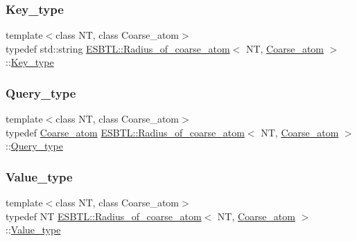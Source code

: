 \subsubsection{\texorpdfstring{Key\+\_\+type}{Key\_type}}
{\footnotesize\ttfamily template$<$class NT, class Coarse\+\_\+atom$>$ \\
typedef std\+::string \hyperlink{classESBTL_1_1Radius__of__coarse__atom}{E\+S\+B\+T\+L\+::\+Radius\+\_\+of\+\_\+coarse\+\_\+atom}$<$ NT, \hyperlink{classESBTL_1_1Coarse__atom}{Coarse\+\_\+atom} $>$\+::\hyperlink{classESBTL_1_1Radius__of__coarse__atom_ade5e52860ae3bd455e1797394fb111c3}{Key\+\_\+type}}

\mbox{\label{classESBTL_1_1Radius__of__coarse__atom_acbb080cc53888dc8ee71551a06921e7d}} 
\subsubsection{\texorpdfstring{Query\+\_\+type}{Query\_type}}
{\footnotesize\ttfamily template$<$class NT, class Coarse\+\_\+atom$>$ \\
typedef \hyperlink{classESBTL_1_1Coarse__atom}{Coarse\+\_\+atom} \hyperlink{classESBTL_1_1Radius__of__coarse__atom}{E\+S\+B\+T\+L\+::\+Radius\+\_\+of\+\_\+coarse\+\_\+atom}$<$ NT, \hyperlink{classESBTL_1_1Coarse__atom}{Coarse\+\_\+atom} $>$\+::\hyperlink{classESBTL_1_1Radius__of__coarse__atom_acbb080cc53888dc8ee71551a06921e7d}{Query\+\_\+type}}

\mbox{\label{classESBTL_1_1Radius__of__coarse__atom_a6e2d08b3508edda6ae66f13af0260328}} 
\subsubsection{\texorpdfstring{Value\+\_\+type}{Value\_type}}
{\footnotesize\ttfamily template$<$class NT, class Coarse\+\_\+atom$>$ \\
typedef NT \hyperlink{classESBTL_1_1Radius__of__coarse__atom}{E\+S\+B\+T\+L\+::\+Radius\+\_\+of\+\_\+coarse\+\_\+atom}$<$ NT, \hyperlink{classESBTL_1_1Coarse__atom}{Coarse\+\_\+atom} $>$\+::\hyperlink{classESBTL_1_1Radius__of__coarse__atom_a6e2d08b3508edda6ae66f13af0260328}{Value\+\_\+type}}




